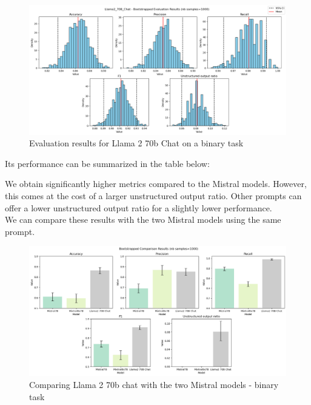 \documentclass[11pt]{article}
\begin{document}
\begin{figure}[h]
    \centering
    \includegraphics[width=\linewidth]{images/llama2/binary/prompt_8/llama2.png}
    \caption{Evaluation results for Llama 2 70b Chat on a binary task}
    \label{fig:enter-label}
\end{figure}

Its performance can be summarized in the table below: \\

\begin{table}[h]
    \centering
    \caption{Binary task: evaluating Llama 2 70b chat}
    \label{tab:my_label}
\end{table}

We obtain significantly higher metrics compared to the Mistral models. However, this comes at the cost of a larger unstructured output ratio. Other prompts can offer a lower unstructured output ratio for a slightly lower performance.\\

We can compare these results with the two Mistral models using the same prompt.\\

\begin{figure}[h]
    \centering
    \includegraphics[width=\linewidth]{images/llama2/binary/prompt_8/comparison.png}
    \caption{Comparing Llama 2 70b chat with the two Mistral models - binary task}
    \label{fig:enter-label}
\end{figure}
\end{document}

